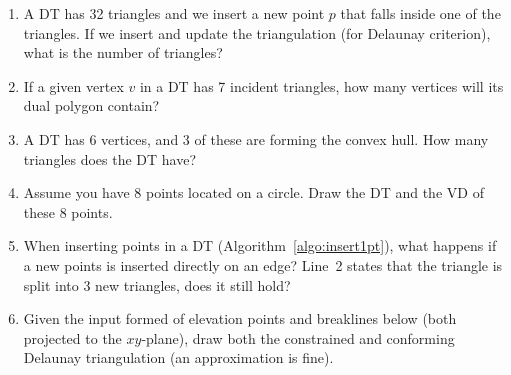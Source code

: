 \begin{enumerate}
  \item A DT has 32 triangles and we insert a new point $p$ that falls inside one of the triangles. If we insert and update the triangulation (for Delaunay criterion), what is the number of triangles?
  \item If a given vertex $v$ in a DT has 7 incident triangles, how many vertices will its dual polygon contain?
  \item A DT has 6 vertices, and 3 of these are forming the convex hull. How many triangles does the DT have?
  \item Assume you have 8 points located on a circle. Draw the DT and the VD of these 8 points.
  \item When inserting points in a DT (Algorithm~\ref{algo:insert1pt}), what happens if a new points is inserted directly on an edge? Line~2 states that the triangle is split into 3 new triangles, does it still hold?
  \item Given the input formed of elevation points and breaklines below (both projected to the $xy$-plane), draw both the constrained and conforming Delaunay triangulation (an approximation is fine).
  \\ \\
\end{enumerate}
